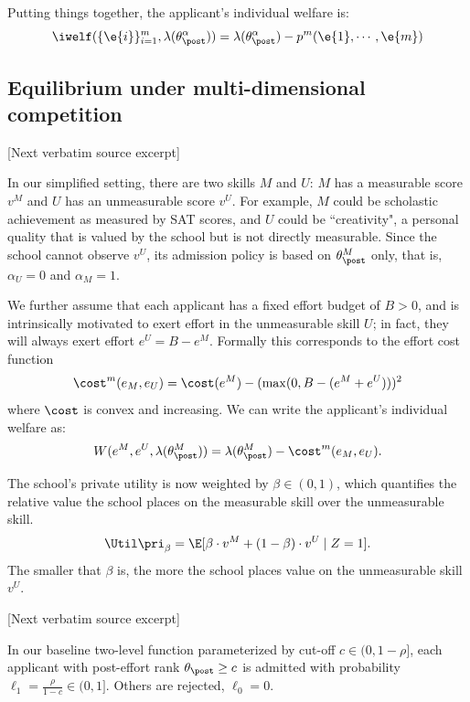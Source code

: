 \documentclass[10pt]{article}
\begin{document}
\begin{ReviewVerbatim}
{Putting things together, the applicant's individual welfare is:
\begin{equation*}
\iwelf(\{ \e{i} \}_{i=1}^m, \lambda(\theta_\post^\alpha)) = \lambda(\theta_\post^\alpha) - p^m( \e{1}, \cdots, \e{m})
\end{equation*}

\subsection{Equilibrium under multi-dimensional competition}\label{sec:multi:linear}


[Next verbatim source excerpt]

In our simplified setting, there are two skills $M$ and $U$: $M$ has a measurable score $v^M$ and $U$ has an unmeasurable score $v^U$. For example, $M$ could be scholastic achievement as measured by SAT scores, and $U$ could be ``creativity", a personal quality that is valued by the school but is not directly measurable.
%
Since the school cannot observe $v^U$, its admission policy is based on $\theta_\post^M$ only, that is, $\alpha_U = 0$ and $\alpha_M = 1$.

We further assume that each applicant has a fixed effort budget of $B > 0$, and is intrinsically motivated to exert effort in the unmeasurable skill $U$; in fact, they will always exert effort $e^U = B - e^M$. Formally this corresponds to the effort cost function \[\cost^m(e_M, e_U) = \cost(e^M) - (\max(0,B-(e^M+e^U)))^2\] where $\cost$ is convex and increasing. We can write the applicant's individual welfare as:
\begin{equation*}
W(e^M, e^U, \lambda(\theta_\post^M)) = \lambda(\theta_\post^M) - \cost^m(e_M, e_U).
\end{equation*}


The school's private utility is now weighted by $\beta \in (0,1)$, which quantifies the relative value the school places on the measurable skill over the unmeasurable skill.
\begin{equation*}
\Util\pri_\beta = \E[\beta\cdot v^M + (1-\beta)\cdot v^U\mid Z=1].
\end{equation*}
The smaller that $\beta$ is, the more the school places value on the unmeasurable skill $v^U$.

[Next verbatim source excerpt]

\begin{definition}\label{assump:2-level-fixed-cap} In our baseline two-level function parameterized by cut-off $c \in (0,1-\rho]$, each applicant with post-effort rank  $\theta_\post \geq c$ is admitted with probability $\ell_1 =\frac{\rho}{1-c} \in (0,1]$. Others are rejected, $\ell_0 = 0$.
\end{definition}

}
\end{ReviewVerbatim}
\end{document}
